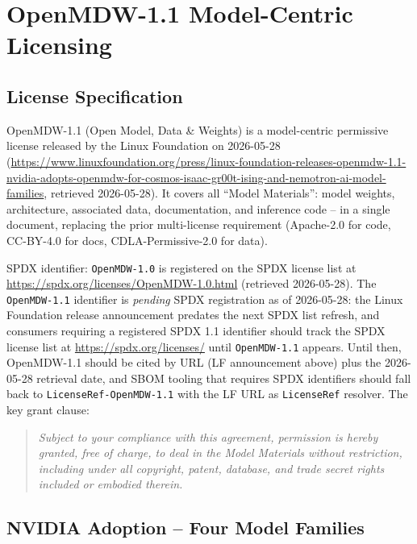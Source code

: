\section{OpenMDW-1.1 Model-Centric Licensing}
\label{sec:openmdw}

\subsection{License Specification}
\label{ssec:openmdw-spec}

OpenMDW-1.1 (Open Model, Data \& Weights) is a model-centric permissive
license released by the Linux Foundation on 2026-05-28~\cite{openmdw_deep}
(\url{https://www.linuxfoundation.org/press/linux-foundation-releases-openmdw-1.1-nvidia-adopts-openmdw-for-cosmos-isaac-gr00t-ising-and-nemotron-ai-model-families},
retrieved 2026-05-28).  It covers all ``Model Materials'': model weights,
architecture, associated data, documentation, and inference code -- in a
single document, replacing the prior multi-license requirement (Apache-2.0
for code, CC-BY-4.0 for docs, CDLA-Permissive-2.0 for data).

SPDX identifier: \texttt{OpenMDW-1.0} is registered on the SPDX license
list at \url{https://spdx.org/licenses/OpenMDW-1.0.html} (retrieved
2026-05-28).  The \texttt{OpenMDW-1.1} identifier is \emph{pending} SPDX
registration as of 2026-05-28: the Linux Foundation release announcement
predates the next SPDX list refresh, and consumers requiring a registered
SPDX 1.1 identifier should track the SPDX license list at
\url{https://spdx.org/licenses/} until \texttt{OpenMDW-1.1} appears.  Until
then, OpenMDW-1.1 should be cited by URL (LF announcement above) plus the
2026-05-28 retrieval date, and SBOM tooling that requires SPDX identifiers
should fall back to \texttt{LicenseRef-OpenMDW-1.1} with the LF URL as
\texttt{LicenseRef} resolver.  The key grant clause:
\begin{quote}
  \emph{Subject to your compliance with this agreement, permission is hereby
  granted, free of charge, to deal in the Model Materials without
  restriction, including under all copyright, patent, database, and trade
  secret rights included or embodied therein.}
\end{quote}

\subsection{NVIDIA Adoption -- Four Model Families}
\label{ssec:nvidia-adoption}

